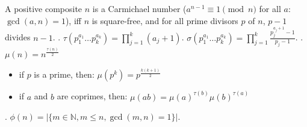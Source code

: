 A positive composite $n$ is a Carmichael number
($a^{n-1} \equiv 1 \pmod{n}$ for all $a$: $\gcd(a,n)=1$),
iff $n$ is square-free, and for all prime divisors $p$ of $n$, $p-1$ divides $n-1$. \TopicBreak
{}.
$\tau(p_1^{a_1} \dots p_k^{a_k}) = \prod_{j=1}^k (a_j+1)$. \quad
$\sigma(p_1^{a_1} \dots p_k^{a_k}) = \prod_{j=1}^k \frac{p_j^{a_j+1}-1}{p_j-1}$. \TopicBreak
{}.
$\mu(n) = n^{\frac{\tau(n)}{2}}$
\begin{itemize}
\item if $p$ is a prime, then: $\mu(p^k) = p^{\frac{k(k+1)}{2}}$
\item if $a$ and $b$ are coprimes, then: $\mu(ab) = \mu(a)^{\tau(b)}\mu(b)^{\tau(a)}$
\end{itemize}
.  $\phi(n)=|\{m \in {\mathbb N}, m \le n, \gcd(m, n) = 1 \}|$.
  
